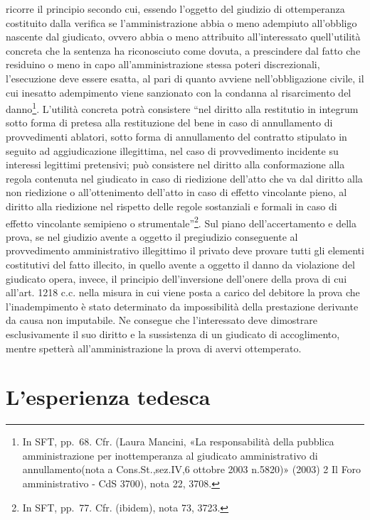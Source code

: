 \documentclass[12pt,it,a4paper,]{report}
\begin{document}
ricorre il principio secondo cui, essendo l'oggetto del giudizio di
ottemperanza costituito dalla verifica se l'amministrazione abbia o meno
adempiuto all'obbligo nascente dal giudicato, ovvero abbia o meno
attribuito all'interessato quell'utilità concreta che la sentenza ha
riconosciuto come dovuta, a prescindere dal fatto che residuino o meno
in capo all'amministrazione stessa poteri discrezionali, l'esecuzione
deve essere esatta, al pari di quanto avviene nell'obbligazione civile,
il cui inesatto adempimento viene sanzionato con la condanna al
risarcimento del danno\footnote{In SFT, pp.~68. Cfr. (Laura Mancini,
  {«La responsabilità della pubblica amministrazione per inottemperanza
  al giudicato amministrativo di annullamento(nota a Cons.St.,sez.IV,6
  ottobre 2003 n.5820)»} (2003) 2 Il Foro amministrativo - CdS 3700),
  nota 22, 3708.}. L'utilità concreta potrà consistere ``nel diritto
alla restitutio in integrum sotto forma di pretesa alla restituzione del
bene in caso di annullamento di provvedimenti ablatori, sotto forma di
annullamento del contratto stipulato in seguito ad aggiudicazione
illegittima, nel caso di provvedimento incidente su interessi legittimi
pretensivi; può consistere nel diritto alla conformazione alla regola
contenuta nel giudicato in caso di riedizione dell'atto che va dal
diritto alla non riedizione o all'ottenimento dell'atto in caso di
effetto vincolante pieno, al diritto alla riedizione nel rispetto delle
regole sostanziali e formali in caso di effetto vincolante semipieno o
strumentale''\footnote{In SFT, pp.~77. Cfr. (ibidem), nota 73, 3723.}.
Sul piano dell'accertamento e della prova, se nel giudizio avente a
oggetto il pregiudizio conseguente al provvedimento amministrativo
illegittimo il privato deve provare tutti gli elementi costitutivi del
fatto illecito, in quello avente a oggetto il danno da violazione del
giudicato opera, invece, il principio dell'inversione dell'onere della
prova di cui all'art. 1218 c.c. nella misura in cui viene posta a carico
del debitore la prova che l'inadempimento è stato determinato da
impossibilità della prestazione derivante da causa non imputabile. Ne
consegue che l'interessato deve dimostrare esclusivamente il suo diritto
e la sussistenza di un giudicato di accoglimento, mentre spetterà
all'amministrazione la prova di avervi ottemperato.

\hypertarget{lesperienza-tedesca}{%
\chapter{L'esperienza tedesca}\label{lesperienza-tedesca}}
\end{document}

